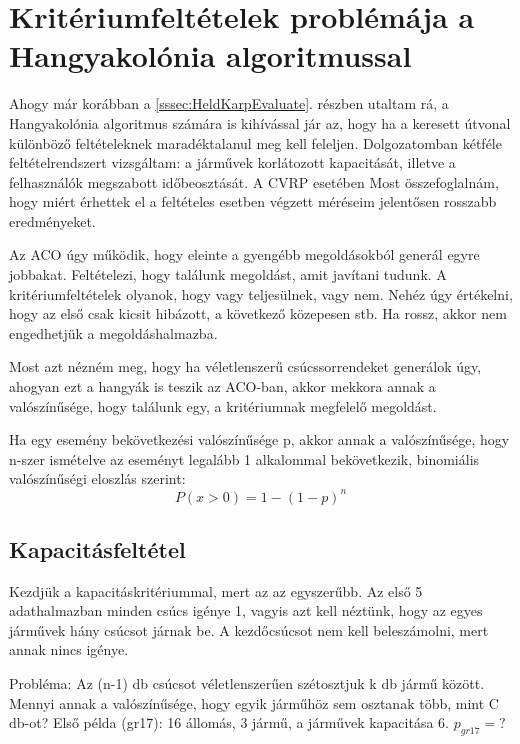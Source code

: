 \section{Kritériumfeltételek problémája a Hangyakolónia algoritmussal}
\label{section:conditionsWithACO}
Ahogy már korábban a \ref{sssec:HeldKarpEvaluate}. részben utaltam rá, a Hangyakolónia algoritmus számára is kihívással jár az, hogy ha a keresett útvonal különböző feltételeknek maradéktalanul meg kell feleljen. Dolgozatomban kétféle feltételrendszert vizsgáltam: a járművek korlátozott kapacitását, illetve a felhasználók megszabott időbeosztását. A CVRP esetében Most összefoglalnám, hogy miért érhettek el a feltételes esetben végzett méréseim jelentősen rosszabb eredményeket.

Az ACO úgy működik, hogy eleinte a gyengébb megoldásokból generál egyre jobbakat. Feltételezi, hogy találunk megoldást, amit javítani tudunk. A kritériumfeltételek olyanok, hogy vagy teljesülnek, vagy nem. Nehéz úgy értékelni, hogy az első csak kicsit hibázott, a következő közepesen stb. Ha rossz, akkor nem engedhetjük a megoldáshalmazba.

Most azt nézném meg, hogy ha véletlenszerű csúcssorrendeket generálok úgy, ahogyan ezt a hangyák is teszik az ACO-ban, akkor mekkora annak a valószínűsége, hogy találunk egy, a kritériumnak megfelelő megoldást.

Ha egy esemény bekövetkezési valószínűsége p, akkor annak a valószínűsége, hogy n-szer ismételve az eseményt legalább 1 alkalommal bekövetkezik, binomiális valószínűségi eloszlás szerint:
\begin{equation}
	P(x>0) = 1-(1-p)^n
	\label{binomial_probability}
\end{equation}

\subsection{Kapacitásfeltétel}
Kezdjük a kapacitáskritériummal, mert az az egyszerűbb. Az első 5 adathalmazban minden csúcs igénye 1, vagyis azt kell néztünk, hogy az egyes járművek hány csúcsot járnak be. A kezdőcsúcsot nem kell beleszámolni, mert annak nincs igénye. 

Probléma: Az (n-1) db csúcsot véletlenszerűen szétosztjuk k db jármű között. Mennyi annak a valószínűsége, hogy egyik járműhöz sem osztanak több, mint C db-ot? Első példa (gr17): 16 állomás, 3 jármű, a járművek kapacitása 6. \(p_{gr17}=?\)

\newcommand{\pgr}{0,258}

